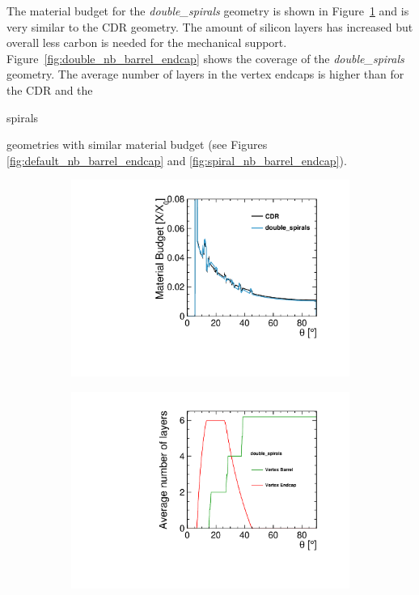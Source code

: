 The material budget for the {\it double\_spirals} geometry is shown in Figure~\ref{fig:materialBudgSpiralEndcap_double} and is very similar to the CDR geometry. The amount of silicon layers has increased but overall less carbon is needed for the mechanical support. \\
Figure~\ref{fig:double_nb_barrel_endcap} shows the coverage of the {\it double\_spirals} geometry. The average number of layers in the vertex endcaps is higher than for the CDR and the \begin{it}spirals\end{it} geometries with similar material budget (see Figures \ref{fig:default_nb_barrel_endcap} and \ref{fig:spiral_nb_barrel_endcap}). 

\begin{figure}[H]
  \begin{subfigure}[b]{0.5\textwidth}
    \centering
    \includegraphics[scale=0.4]{Figures/Geometries/material_budget_double_spirals.pdf}
    \caption{}\label{fig:materialBudgSpiralEndcap_double}
\end{subfigure} \quad
  \begin{subfigure}[b]{0.5\textwidth}
    \centering
    \includegraphics[scale=0.4]{Figures/Geometries/nb_layer_double.pdf}

\end{subfigure}
\end{figure}

